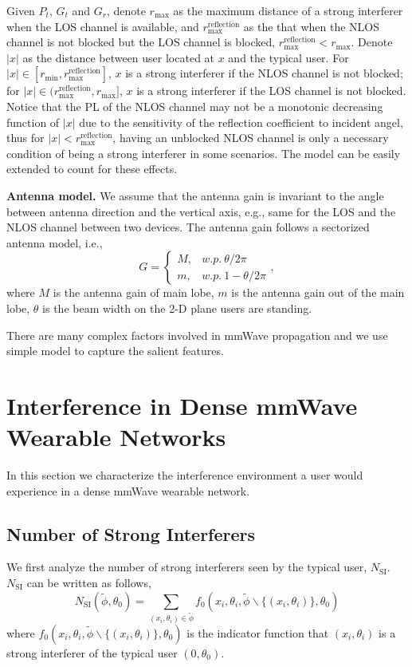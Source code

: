 \documentclass[10pt, conference, letterpaper]{IEEEtran}
\begin{document}
Given $P_t$, $G_t$ and $G_r$, denote $r_{\max}$ as the maximum distance of a strong interferer when the LOS channel is available, and $r_{\max}^{\mathrm{reflection}}$ as the that when the NLOS channel is not blocked but the LOS channel is blocked, $r_{\max}^{\mathrm{reflection}}<r_{\max}$.
Denote $|x|$ as the distance between user located at $x$ and the typical user. 
For $|x|\in[r_{\min},r_{\max}^{\mathrm{reflection}}]$, $x$ is a strong interferer if the NLOS channel is not blocked; for $|x|\in(r_{\max}^{\mathrm{reflection}}, r_{\max}]$, $x$ is a strong interferer if the LOS channel is not blocked.
Notice that the PL of the NLOS channel may not be a monotonic decreasing function of $|x|$ due to the sensitivity of the reflection coefficient to incident angel, thus for $|x|<r_{\max}^{\mathrm{reflection}}$, having an unblocked NLOS channel is only a necessary condition of being a strong interferer in some scenarios. 
The model can be easily extended to count for these effects. 


\textbf{Antenna model.} We assume that the antenna gain is invariant to the angle between antenna direction and the vertical axis, e.g., same for the LOS and the NLOS channel between two devices. 
The antenna gain follows a sectorized antenna model, i.e., 
\begin{equation*}
G = 
\begin{cases}
M, & w.p. ~ \theta/2\pi \\
m, & w.p. ~ 1-\theta/2\pi
\end{cases},
\end{equation*}
where $M$ is the antenna gain of main lobe, $m$ is the antenna gain out of the main lobe, $\theta$ is the beam width on the 2-D plane users are standing.

There are many complex factors involved in mmWave propagation and we use simple model to capture the salient features.


\section{Interference in Dense mmWave Wearable Networks}\label{section:interference}
In this section we characterize the interference environment a user would experience in a dense mmWave wearable network.


\subsection{Number of Strong Interferers}\label{section:channel:number}
We first analyze the number of strong interferers seen by the typical user, $N_{\mathrm{SI}}$. 
$N_{\mathrm{SI}}$ can be written as follows, 
\begin{equation}
N_{\mathrm{SI}}(\tilde{\phi}, \theta_0) = \sum_{(x_i, \theta_i)\in \tilde{\phi}}f_0(x_i, \theta_i, \tilde{\phi}\backslash\{(x_i,\theta_i)\}, \theta_0)
\end{equation}
where $f_0(x_i, \theta_i, \tilde{\phi}\backslash\{(x_i,\theta_i)\}, \theta_0)$ is the indicator function that $(x_i, \theta_i)$ is a strong interferer of the typical user $(0,\theta_0)$.
\end{document}
